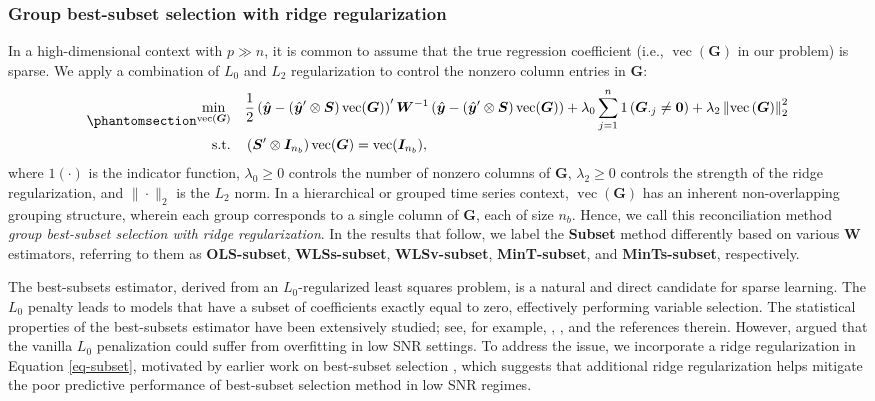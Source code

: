 \documentclass[
  11pt]{article}
\theoremstyle{plain}
\theoremstyle{remark}
\begin{document}
\subsubsection*{Group best-subset selection with ridge
regularization}\label{group-best-subset-selection-with-ridge-regularization}

In a high-dimensional context with \(p \gg n\), it is common to assume
that the true regression coefficient (i.e.,
\(\operatorname{vec}(\bm{G})\) in our problem) is sparse. We apply a
combination of \(L_0\) and \(L_2\) regularization to control the nonzero
column entries in \(\bm{G}\):
\begin{equation}\phantomsection\label{eq-subset}{ \begin{aligned}
\min_{\operatorname{vec}(\bm{G})} \quad & \frac{1}{2}\left(\hat{\bm{y}}-\left(\hat{\bm{y}}^{\prime} \otimes \bm{S}\right) \operatorname{vec}(\bm{G})\right)^{\prime} \bm{W}^{-1}\left(\hat{\bm{y}}-\left(\hat{\bm{y}}^{\prime} \otimes \bm{S}\right) \operatorname{vec}(\bm{G})\right) + \lambda_0 \sum_{j=1}^n 1\left(\bm{G}_{\cdot j} \neq \bm{0}\right) + \lambda_2 \left\|\operatorname{vec}\left(\bm{G}\right)\right\|_2^2 \\
\text{s.t.} \quad & \left(\bm{S}^{\prime} \otimes \bm{I}_{n_b}\right) \operatorname{vec}(\bm{G})=\operatorname{vec}(\bm{I}_{n_b}),
\end{aligned}
}\end{equation} where \(1(\cdot)\) is the indicator function,
\(\lambda_0 \geq 0\) controls the number of nonzero columns of
\(\bm{G}\), \(\lambda_2 \geq 0\) controls the strength of the ridge
regularization, and \(\|\cdot\|_2\) is the \(L_2\) norm. In a
hierarchical or grouped time series context,
\(\operatorname{vec}(\bm{G})\) has an inherent non-overlapping grouping
structure, wherein each group corresponds to a single column of
\(\bm{G}\), each of size \(n_b\). Hence, we call this reconciliation
method \emph{group best-subset selection with ridge regularization}. In
the results that follow, we label the \textbf{Subset} method differently
based on various \(\bm{W}\) estimators, referring to them as
\textbf{OLS-subset}, \textbf{WLSs-subset}, \textbf{WLSv-subset},
\textbf{MinT-subset}, and \textbf{MinTs-subset}, respectively.

The best-subsets estimator, derived from an \(L_0\)-regularized least
squares problem, is a natural and direct candidate for sparse learning.
The \(L_0\) penalty leads to models that have a subset of coefficients
exactly equal to zero, effectively performing variable selection. The
statistical properties of the best-subsets estimator have been
extensively studied; see, for example, \citet{Greenshtein2004-be},
\citet{Zhang2012-ge}, and the references therein. However,
\citet{Mazumder2022-hx} argued that the vanilla \(L_0\) penalization
could suffer from overfitting in low SNR settings. To address the issue,
we incorporate a ridge regularization in Equation \eqref{eq-subset},
motivated by earlier work on best-subset selection
\citep[e.g.,][]{Hazimeh2020-xd, Mazumder2022-hx}, which suggests that
additional ridge regularization helps mitigate the poor predictive
performance of best-subset selection method in low SNR regimes.
\end{document}
